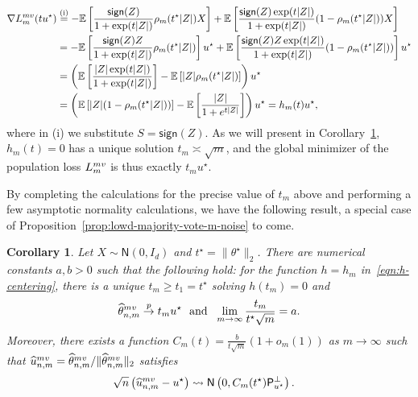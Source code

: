 \documentclass[11pt]{article}
\newcommand{\cc}[1]{\textcolor{cc}{[CC: #1]}}
\newcommand{\Ep}{\mathbb{E}}
\newcommand{\brk}[1]{\left[{#1}\right]} %
\newcommand{\what}[1]{\widehat{#1}}
\newcommand{\sgn}{\mathsf{sign}}
\newcommand{\normal}{\mathsf{N}}
\newcommand{\mv}{^{\textup{mv}}}
\newcommand{\proj}{\mathsf{P}}
\newcommand{\poploss}{L}
\newcommand{\norms}[1]{\|{#1}\|} %
\newcommand{\ltwos}[1]{\norms{#1}_2} %
\newcommand{\<}{\langle} %
\renewcommand{\>}{\rangle}
\newcommand{\cd}{\rightsquigarrow}
\newcommand{\cp}{\stackrel{p}{\rightarrow}}
\newcommand{\opt}{^\star}
\newcommand{\mve}{\what{\theta}\mv_{n,m}} %
\newtheorem{corollary}{Corollary}
\begin{document}
\begin{align}
  \nabla \poploss\mv_m(t u^\star) 
  & \stackrel{\mathrm{(i)}}{=} - \Ep \left[\frac{\sgn(Z)}{1 + \exp(t|Z|)} \rho_m(t^\star |Z|) X \right]  + \Ep \left[\frac{\sgn(Z)\exp(t|Z|)}{1 + \exp(t|Z|)} (1-\rho_m(t^\star |Z|)) X \right] \nonumber	\\
  &= - \Ep \left[\frac{\sgn(Z)Z}{1 + \exp(t|Z|)} \rho_m(t^\star |Z|)\right] u^\star  + \Ep \left[\frac{\sgn(Z)Z\exp(t|Z|)}{1 + \exp(t|Z|)} (1-\rho_m(t^\star |Z|))\right]  u^\star \nonumber \\
  & = \left(\Ep \left[\frac{|Z|  \exp(t|Z|)}{1 + \exp(t|Z|)}\right] - \Ep \left[|Z| \rho_m(t^\star |Z|) \right]\right) u^\star \nonumber \\
  & = \left(\Ep \brk{|Z|(1-\rho_m(t^\star  |Z|))}-\Ep \brk{\frac{|Z|}{1 + e^{t|Z|}}}\right) u^\star = h_m(t) u^\star  , \label{eq:majority-vote-root}
\end{align} 
where in (i) we substitute $S = \sgn(Z)$. As we will present in
Corollary~\ref{cor:lowd-majority-vote-m}, $h_m(t)=0$ has a unique solution
$t_m \asymp \sqrt m$, and the global minimizer of the population loss
$\poploss\mv_m$ is thus exactly $t_m u\opt$.


By completing the calculations for the precise value of
$t_m$ above and performing a few asymptotic normality calculations,
we have the following result, a 
special case of Proposition~\ref{prop:lowd-majority-vote-m-noise} to come.

\begin{corollary} \label{cor:lowd-majority-vote-m}
  Let $X \sim \normal(0, I_d)$
  and $t\opt = \ltwos{\theta\opt}$.
  There are numerical constants $a, b > 0$ such that the following hold: for the function $h = h_m$ in~\eqref{eqn:h-centering},
  there is a unique $t_m \geq t_1 = t^\star$ solving $h(t_m) = 0$
  and 
  \begin{equation*}
    \what{\theta}\mv_{n,m} \cp t_m u\opt
    ~~ \mbox{and} ~~
    \lim_{m \to \infty} \frac{t_m}{t\opt \sqrt{m}} = a.
  \end{equation*}
  Moreover,
  there exists a function
  $C_m(t) = \frac{b}{t \sqrt{m}}(1 + o_m(1))$
  as $m \to \infty$ such that
  $\what{u}\mv_{n,m} = \mve/\ltwos{\mve}$ satisfies
  \begin{align*}
    \sqrt{n} \left(\what{u}\mv_{n,m} - u^\star \right) &\cd \normal\left(0, C_m(t\opt) {\proj_{u\opt}^\perp}\right).
  \end{align*}
\end{corollary}
\end{document}

